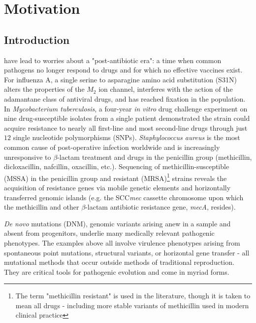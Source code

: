 \chapter{Motivation}
\label{ch:motivation}

\section{Introduction}

 have lead to worries about a "post-antibiotic era": a time when common pathogens no longer respond to drugs and for which no effective vaccines exist\cite{WorldHealthOrganization:2014ug}.  For influenza A, a single serine to asparagine amino acid substitution (S31N) alters the properties of the $M_2$ ion channel\cite{Wang:1993uc}, interferes with the action of the adamantane class of antiviral drugs, and has reached fixation in the population\cite{Nelson:2009en}.  In \textit{Mycobacterium tuberculosis}, a four-year \textit{in vitro} drug challenge experiment on nine drug-susceptible isolates from a single patient demonstrated the strain could acquire resistance to nearly all first-line and most second-line drugs through just $12$ single nucleotide polymorphisms (SNPs)\cite{Eldholm:2014ei}.  \textit{Staphylococcus aureus} is the most common cause of post-operative infection worldwide and is increasingly unresponsive to $\beta$-lactam treatment and drugs in the penicillin group (methicillin, dicloxacillin, nafcillin, oxacillin, etc.).  Sequencing of methicillin-susceptible (MSSA) in the penicillin group and resistant (MRSA)\footnote{The term "methicillin resistant" is used in the literature, though it is taken to mean all drugs - including more stable variants of methicillin used in modern clinical practice} strains reveals the acquisition of resistance genes via mobile genetic elements and horizontally transferred genomic islands (e.g. the SCC\textit{mec} cassette chromosome upon which the methicillin and other $\beta$-lactam antibiotic resistance gene, \textit{mecA}, resides)\cite{Holden:2004kd}.

\textit{De novo} mutations (DNM), genomic variants arising anew in a sample and absent from progenitors, underlie many medically relevant pathogenic phenotypes.  The examples above all involve virulence phenotypes arising from spontaneous point mutations, structural variants, or horizontal gene transfer - all mutational methods that occur outside methods of traditional reproduction.  They are critical tools for pathogenic evolution and come in myriad forms.

